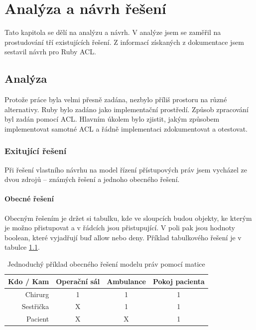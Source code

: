 \chapter{Analýza a návrh řešení}
Tato kapitola se dělí na analýzu a návrh. V analýze jsem se zaměřil na prostudování tří existujících řešení. Z informací získaných z dokumentace jsem sestavil návrh pro Ruby ACL.

\section{Analýza}

Protože práce byla velmi přesně zadána, nezbylo příliš prostoru na různé alternativy. Ruby bylo zadáno jako implementační prostředí. Způsob zpracování byl zadán pomocí ACL. Hlavním úkolem bylo zjistit, jakým způsobem implementovat samotné ACL a řádně implementaci zdokumentovat a otestovat.

\subsection{Exitující řešení}
\label{sec:anal-existujicireseni}

Při řešení vlastního návrhu na model řízení přístupových práv jsem vycházel ze dvou zdrojů – známých řešení a jednoho obecného řešení.

\subsubsection{Obecné řešení}
Obecným řešením je držet si tabulku, kde ve sloupcích budou objekty, ke kterým je možno přistupovat a v řádcích jsou přistupující. V poli pak jsou hodnoty boolean, které vyjadřují buď allow nebo deny. Příklad tabulkového řešení je v tabulce \ref{tab:tab2}.
\begin{table}%
\centering
\begin{tabular}{|r||c|c|c|}
\hline
Kdo / Kam & Operační sál & Ambulance & Pokoj pacienta\\
\hline\hline
Chirurg & 1 & 1 & 1\\
\hline
Sestřička & X & 1 & 1\\
\hline
Pacient & X & X & 1\\
\hline
\end{tabular}
\caption{Jednoduchý příklad obecného řešení modelu práv pomocí matice}
\label{tab:tab2}
\end{table}


